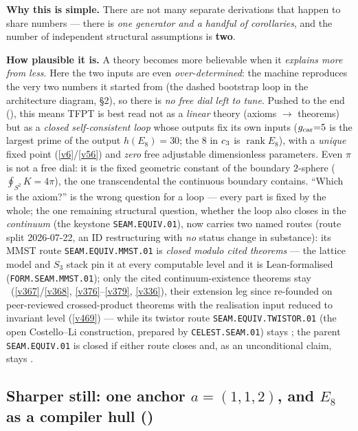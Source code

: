 \smallskip
\noindent\textbf{Why this is simple.} There are not many separate derivations that happen to share numbers ---
there is \emph{one generator and a handful of corollaries}, and the number of independent structural
assumptions is \textbf{two}.

\smallskip
\noindent\textbf{How plausible it is.} A theory becomes more believable when it \emph{explains more from less}.
Here the two inputs are even \emph{over-determined}: the machine reproduces the very two numbers it
started from (the dashed bootstrap loop in the architecture diagram, \S2), so there is \emph{no free
dial left to tune}. Pushed to the end (), this means TFPT is best read not as a
\emph{linear} theory (axioms $\to$ theorems) but as a \emph{closed self-consistent loop} whose outputs fix its own
inputs ($g_{\mathrm{car}}{=}5$ is the largest prime of the output $h(E_8){=}30$; the $8$ in $c_3$ is $\operatorname{rank}E_8$),
with a \emph{unique} fixed point (\vref{v6}/\vref{v56}) and \emph{zero} free adjustable dimensionless parameters.
Even $\pi$ is not a free dial: it is the fixed geometric constant of the boundary $2$-sphere
($\oint_{S^2}K=4\pi$), the one transcendental the continuous boundary contains. ``Which is the axiom?'' is the
wrong question for a loop --- every part is fixed by the whole; the one remaining structural question, whether the loop
also closes in the \emph{continuum} (the keystone \texttt{SEAM.EQUIV.01}), now carries two named routes (route
split 2026-07-22, an ID restructuring with \emph{no} status change in substance): its MMST route
\texttt{SEAM.EQUIV.MMST.01} is \emph{closed modulo cited
theorems} --- the lattice model and $S_3$ stack pin it at every computable level and it is Lean-formalised
(\texttt{FORM.SEAM.MMST.01}); only the cited continuum-existence theorems stay \mO\ (\vref{v367}/\vref{v368},
\vref{v376}--\vref{v379}, \vref{v336}), their extension leg since re-founded on peer-reviewed crossed-product
theorems with the realisation input reduced to invariant level (\vref{v469}) --- while its twistor route
\texttt{SEAM.EQUIV.TWISTOR.01} (the open Costello--Li construction, prepared by \texttt{CELEST.SEAM.01}) stays
\mO; the parent \texttt{SEAM.EQUIV.01} is closed if either route closes and, as an unconditional claim, stays \mO.

\subsection*{Sharper still: one anchor $a=(1,1,2)$, and $E_8$ as a compiler hull \texorpdfstring{(\mE)}{}}

